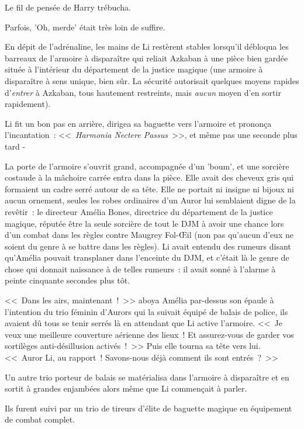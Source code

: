 Le fil de pensée de Harry trébucha.

Parfois, 'Oh, merde' était très loin de suffire.

\later

En dépit de l'adrénaline, les mains de Li restèrent stables lorsqu'il débloqua les barreaux de l'armoire à disparaître qui reliait Azkaban à une pièce bien gardée située à l'intérieur du département de la justice magique (une armoire à disparaître à sens unique, bien sûr. La sécurité autorisait quelques moyens rapides d'\emph{entrer} à Azkaban, tous hautement restreints, mais \emph{aucun} moyen d'en sortir rapidement).

Li fit un bon pas en arrière, dirigea sa baguette vers l'armoire et prononça l'incantation~: <<~\emph{Harmonia Nectere Passus}~>>, et même pas une seconde plus tard -

La porte de l'armoire s'ouvrit grand, accompagnée d'un 'boum', et une sorcière costaude à la mâchoire carrée entra dans la pièce. Elle avait des cheveux gris qui formaient un cadre serré autour de sa tête. Elle ne portait ni insigne ni bijoux ni aucun ornement, seules les robes ordinaires d'un Auror lui semblaient digne de la revêtir~: le directeur Amélia Bones, directrice du département de la justice magique, réputée être la seule sorcière de tout le DJM à avoir une chance lors d'un combat dans les règles contre Maugrey Fol-Œil (non pas qu'aucun d'eux ne soient du genre à se battre dans les règles). Li avait entendu des rumeurs disant qu'Amélia pouvait transplaner dans l'enceinte du DJM, et c'était là le genre de chose qui donnait naissance à de telles rumeurs~: il avait sonné à l'alarme à peinte cinquante secondes plus tôt.

<<~Dans les airs, maintenant~!~>> aboya Amélia par-dessus son épaule à l'intention du trio féminin d'Aurors qui la suivait équipé de balais de police, ils avaient dû tous se tenir serrés là en attendant que Li active l'armoire. <<~Je veux une meilleure couverture aérienne des lieux~! Et assurez-vous de garder vos sortilèges anti-désillusion activés~!~>> Puis elle tourna sa tête vers lui. <<~Auror Li, au rapport~! Savons-nous déjà comment ils sont entrés~?~>>

Un autre trio porteur de balais se matérialisa dans l'armoire à disparaître et en sortit à grandes enjambées alors même que Li commençait à parler.

Ils furent suivi par un trio de tireurs d'élite de baguette magique en équipement de combat complet.


